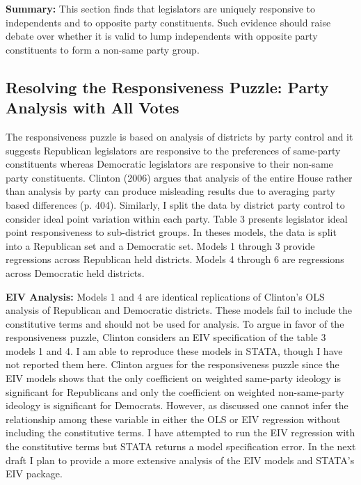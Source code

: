 \documentclass[10pt,letterpaper]{article}
\begin{document}
\textbf{Summary:} This section finds that legislators are uniquely responsive to independents and to opposite party constituents. Such evidence should raise debate over whether it is valid to lump independents with opposite party constituents to form a non-same party group.
 

\newpage

\newpage

\subsection{Resolving the Responsiveness Puzzle: Party Analysis with All Votes} The responsiveness puzzle is based on analysis of districts by party control and it suggests Republican legislators are responsive to the preferences of same-party constituents whereas Democratic legislators are responsive to their non-same party constituents. Clinton (2006) argues that analysis of the entire House rather than analysis by party can produce misleading results due to averaging party based differences (p. 404). Similarly, I split the data by district party control to consider ideal point variation within each party. Table 3 presents legislator ideal point responsiveness to sub-district groups. In theses models, the data is split into a Republican set and a Democratic set. Models 1 through 3 provide regressions across Republican held districts. Models 4 through 6 are regressions across Democratic held districts.

\textbf{EIV Analysis:} Models 1 and 4 are identical replications of Clinton's OLS analysis of Republican and Democratic districts. These models fail to include the constitutive terms and should not be used for analysis. To argue in favor of the responsiveness puzzle, Clinton considers an EIV specification of the table 3 models 1 and 4. I am able to reproduce these models in STATA, though I have not reported them here. Clinton argues for the responsiveness puzzle since the EIV models shows that the only coefficient on weighted same-party ideology is significant for Republicans and only the coefficient on weighted non-same-party ideology is significant for Democrats. However, as discussed one cannot infer the relationship among these variable in either the OLS or EIV regression without including the constitutive terms. I have attempted to run the EIV regression with the constitutive terms but STATA returns a model specification error. In the next draft I plan to provide a more extensive analysis of the EIV  models and STATA's EIV package.
\end{document}
